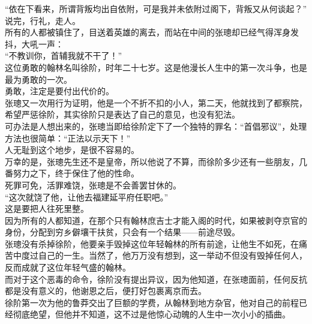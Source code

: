 \begin{multicols}{\theparacolNo}
“依在下看来，所谓背叛均出自依附，可是我并未依附过阁下，背叛又从何谈起？”\\

说完，行礼，走人。\\

所有的人都被镇住了，目送着英雄的离去，而站在中间的张璁却已经气得浑身发抖，大吼一声：\\

“不教训你，首辅我就不干了！”\\

这位勇敢的翰林名叫徐阶，时年二十七岁。这是他漫长人生中的第一次斗争，也是最为勇敢的一次。\\

勇敢，注定是要付出代价的。\\

张璁又一次用行为证明，他是一个不折不扣的小人，第二天，他就找到了都察院，希望严惩徐阶，其实徐阶只是表达了自己的意见，也没有犯法。\\

可办法是人想出来的，张璁当即给徐阶定下了一个独特的罪名：“首倡邪议”，处理方法也很简单：“正法以示天下！”\\

人无耻到这个地步，是很不容易的。\\

万幸的是，张璁先生还不是皇帝，所以他说了不算，而徐阶多少还有一些朋友，几番努力之下，终于保住了他的性命。\\

死罪可免，活罪难饶，张璁是不会善罢甘休的。\\

“这次就饶了他，让他去福建延平府任职吧。”\\

这是要把人往死里整。\\

因为所有的人都知道，在那个只有翰林庶吉士才能入阁的时代，如果被剥夺京官的身份，分配到穷乡僻壤干扶贫，只会有一个结果——前途尽毁。\\

张璁没有杀掉徐阶，他要亲手毁掉这位年轻翰林的所有前途，让他生不如死，在痛苦中度过自己的一生。当然了，他万万没有想到，这一举动不但没有毁掉任何人，反而成就了这位年轻气盛的翰林。\\

而对于这个恶毒的命令，徐阶没有提出异议，因为他知道，在张璁面前，任何反抗都是没有意义的，他谢恩之后，便打好包裹离京而去。\\

徐阶第一次为他的鲁莽交出了巨额的学费，从翰林到地方杂官，他对自己的前程已经彻底绝望，但他并不知道，这不过是他惊心动魄的人生中一次小小的插曲。\\


\end{multicols}
